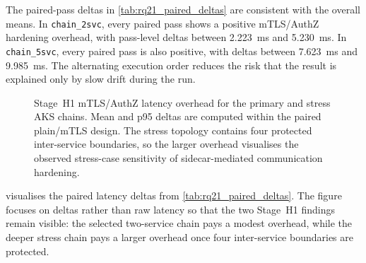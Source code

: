 \begin{table}[ht]
\centering
\caption[Stage~H1 paired-pass latency deltas]{Stage~H1 paired-pass latency deltas. Sources: \texttt{merged/aggregated\_results.md} (per-pass tables) in \texttt{rq2\_1\_paired\_20260515\_160012} and \texttt{rq2\_1\_paired\_20260517\_114303}. The pass-delta std is computed from the five per-pass deltas.}
\label{tab:rq21_paired_deltas}
\end{table}

The paired-pass deltas in \cref{tab:rq21_paired_deltas} are consistent with the
overall means. In \texttt{chain\_2svc}, every paired pass shows a positive
mTLS/AuthZ hardening overhead, with pass-level deltas between 2.223~ms and
5.230~ms. In \texttt{chain\_5svc}, every paired pass is also positive, with
deltas between 7.623~ms and 9.985~ms. The alternating execution order reduces
the risk that the result is explained only by slow drift during the run.

\begin{figure}[htbp]
\centering
\resizebox{0.92\textwidth}{!}{%

}
\caption[Stage~H1 mTLS/AuthZ latency overhead]{Stage~H1 mTLS/AuthZ latency overhead for the primary and stress AKS chains. Mean and p95 deltas are computed within the paired plain/mTLS design. The stress topology contains four protected inter-service boundaries, so the larger overhead visualises the observed stress-case sensitivity of sidecar-mediated communication hardening.}
\label{fig:rq21_mtls_latency_overhead}
\end{figure}

 visualises the paired latency deltas from
\cref{tab:rq21_paired_deltas}. The figure focuses on deltas rather than raw latency so
that the two Stage~H1 findings remain visible: the selected two-service chain pays a
modest overhead, while the deeper stress chain pays a larger overhead once four
inter-service boundaries are protected.

